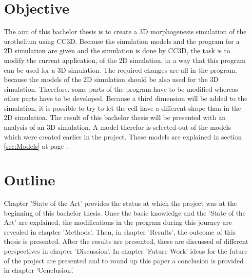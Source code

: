 \section{Objective}
The aim of this bachelor thesis is to create a 3D morphogenesis simulation of the urothelium using \ac{CC3D}. Because the simulation models and the program for a 2D simulation are given and the simulation is done by \ac{CC3D}, the task is to modify the current application, of the 2D simulation, in a way that this program can be used for a 3D simulation. \newline
The required changes are all in the program, because the models of the 2D simulation should be also used for the 3D simulation.
Therefore, some parts of the program have to be modified whereas other parts have to be developed. Because a third dimension will be added to the simulation, it is possible to try to let the cell have a different shape than in the 2D simulation. 
The result of this bachelor thesis will be presented with an analysis of an 3D simulation. A model therefor is selected out of the models which were created earlier in the project. These models are explained in section \ref{sec:Models} at page \pageref{sec:Models}.


\section{Outline}
Chapter 'State of the Art' provides the status at which the project was at the beginning of this bachelor thesis. Once the basic knowledge and the 'State of the Art' are explained, the modifications in the program during this journey are revealed in chapter 'Methods'. Then, in chapter 'Results', the outcome of this thesis is presented. After the results are presented, these are discussed of different perspectives in chapter 'Discussion'. In chapter 'Future Work' ideas for the future of the project are presented and to round up this paper a conclusion is provided in chapter 'Conclusion'.